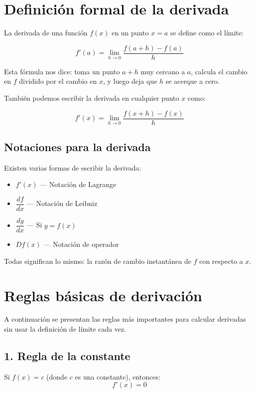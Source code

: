 \documentclass[12pt,a4paper]{article}
\begin{document}
\section{Definición formal de la derivada}

La derivada de una función $f(x)$ en un punto $x=a$ se define como el límite:

\[
f'(a) = \lim_{h \to 0} \frac{f(a+h) - f(a)}{h}
\]

Esta fórmula nos dice: toma un punto $a+h$ muy cercano a $a$, calcula el cambio en $f$ dividido por el cambio en $x$, y luego deja que $h$ se acerque a cero.

\bigskip

También podemos escribir la derivada en cualquier punto $x$ como:

\[
\boxed{f'(x) = \lim_{h \to 0} \frac{f(x+h) - f(x)}{h}}
\]

\subsection*{Notaciones para la derivada}

Existen varias formas de escribir la derivada:

\begin{itemize}
	\item $f'(x)$ --- Notación de Lagrange
	\item $\dfrac{df}{dx}$ --- Notación de Leibniz
	\item $\dfrac{dy}{dx}$ --- Si $y = f(x)$
	\item $Df(x)$ --- Notación de operador
\end{itemize}

Todas significan lo mismo: la razón de cambio instantánea de $f$ con respecto a $x$.

\section{Reglas básicas de derivación}

A continuación se presentan las reglas más importantes para calcular derivadas sin usar la definición de límite cada vez.

\subsection*{1. Regla de la constante}

Si $f(x) = c$ (donde $c$ es una constante), entonces:
\[
\boxed{f'(x) = 0}
\]
\end{document}
